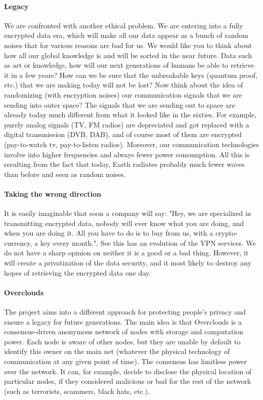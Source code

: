 \paragraph{Legacy} We are confronted with another ethical problem. We are entering into a fully encrypted data era, which will make all our data appear as a bunch of random noises that for various reasons are bad for us. We would like you to think about how all our global knowledge is and will be sorted in the near future. Data such as art or knowledge, how will our next generations of humans be able to retrieve it in a few years? How can we be sure that the unbreakable keys (quantum proof, etc.) that we are making today will not be lost?
Now think about the idea of randomizing (with encryption noises) our communication signals that we are sending into outer space? The signals that we are sending out to space are already today much different from what it looked like in the sixties. For example, purely analog signals (TV, FM radios) are depreciated and got replaced with a digital transmission (DVB, DAB), and of course most of them are encrypted (pay-to-watch tv, pay-to-listen radios). Moreover, our communication technologies involve into higher frequencies and always fewer power consumption. All this is resulting from the fact that today, Earth radiates probably much fewer waves than before and seen as random noises.

\paragraph{Taking the wrong direction} It is easily imaginable that soon a company will say: "Hey, we are specialized in transmitting encrypted data, nobody will ever know what you are doing, and when you are doing it. All you have to do is to buy from us, with a crypto-currency, a key every month.". See this has an evolution of the VPN services. We do not have a sharp opinion on neither it is a good or a bad thing. However, it will create a privatization of the data security, and it most likely to destroy any hopes of retrieving the encrypted data one day.

\paragraph{Overclouds} The project aims into a different approach for protecting people's privacy and ensure a legacy for future generations.
The main idea is that Overclouds is a consensus-driven anonymous network of nodes with storage and computation power. Each node is aware of other nodes, but they are unable by default to identify this owner on the main net (whatever the physical technology of communication at any given point of time). The consensus has limitless power over the network. It can, for example, decide to disclose the physical location of particular nodes, if they considered malicious or bad for the rest of the network (such as terrorists, scammers, black hats, etc.).

